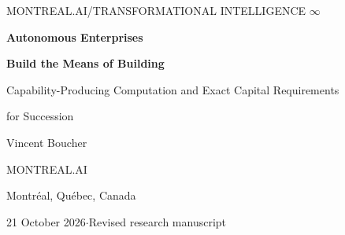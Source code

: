 \documentclass[11pt,letterpaper]{article}
\theoremstyle{definition}\newtheorem{definition}[theorem]{Definition}
\theoremstyle{remark}\newtheorem{remark}[theorem]{Remark}
\begin{document}
\thispagestyle{plain}
\begin{center}
{\small\sffamily\color{accent} MONTREAL.AI\quad /\quad TRANSFORMATIONAL INTELLIGENCE $\infty$}\par
\vspace{.7em}
{\Large\color{accent}\faStar\quad\faCogs}\par
\vspace{.6em}
{\fontsize{32}{36}\selectfont\bfseries\color{ink} Autonomous Enterprises\par}
\vspace{.5em}
{\Large\bfseries Build the Means of Building\par}
\vspace{.45em}
{\large Capability-Producing Computation and Exact Capital Requirements\par}
{\large for Succession\par}
\vspace{.8em}
{\large Vincent Boucher\par}
MONTREAL.AI\par
Montr\'eal, Qu\'ebec, Canada\par
\vspace{.4em}
21 October 2026\quad$\cdot$\quad Revised research manuscript
\end{center}
\end{document}
